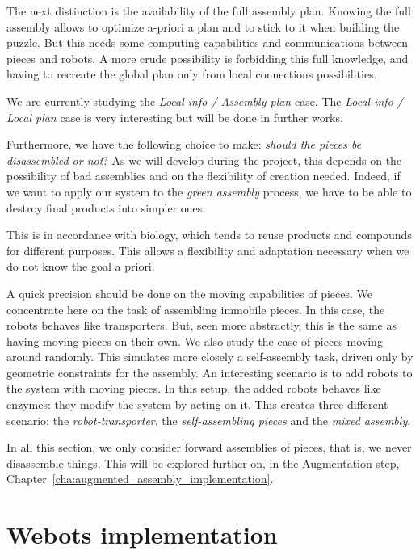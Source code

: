 The next distinction is the availability of the full assembly plan. Knowing the full assembly allows to optimize a-priori a plan and to stick to it when building the puzzle. But this needs some computing capabilities and communications between pieces and robots. A more crude possibility is forbidding this full knowledge, and having to recreate the global plan only from local connections possibilities.

We are currently studying the \textit{Local info / Assembly plan} case. The \textit{Local info / Local plan} case is very interesting but will be done in further works.

Furthermore, we have the following choice to make: \textit{should the pieces be disassembled or not}?
As we will develop during the project, this depends on the possibility of bad assemblies and on the flexibility of creation needed. Indeed, if we want to apply our system to the \textit{green assembly} process, we have to be able to destroy final products into simpler ones.

This is in accordance with biology, which tends to reuse products and compounds for different purposes. This allows a flexibility and adaptation necessary when we do not know the goal a priori.

A quick precision should be done on the moving capabilities of pieces. We concentrate here on the task of assembling immobile pieces. In this case, the robots behaves like transporters. But, seen more abstractly, this is the same as having moving pieces on their own.
We also study the case of pieces moving around randomly. This simulates more closely a self-assembly task, driven only by geometric constraints for the assembly.
An interesting scenario is to add robots to the system with moving pieces. In this setup, the added robots behaves like enzymes: they modify the system by acting on it. This creates three different scenario: the \textit{robot-transporter}, the \textit{self-assembling pieces} and the \textit{mixed assembly}.

In all this section, we only consider forward assemblies of pieces, that is, we never disassemble things. This will be explored further on, in the Augmentation step, Chapter~\ref{cha:augmented_assembly_implementation}.

\section{Webots implementation} %
\label{sec:webots_implementation}
	
